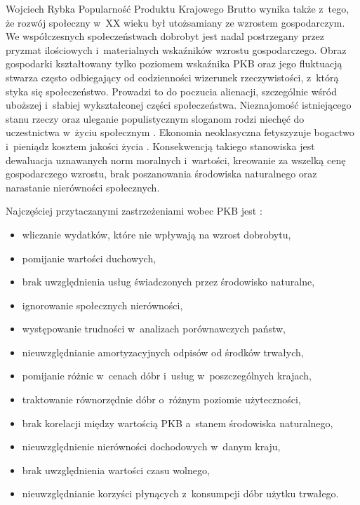 \begin{artplenv}{Wojciech Rybka}
Popularność Produktu Krajowego Brutto wynika także z~tego, że rozwój społeczny w~XX wieku był utożsamiany ze wzrostem
gospodarczym. We współczesnych społeczeństwach dobrobyt jest nadal postrzegany przez pryzmat ilościowych i~materialnych
wskaźników wzrostu gospodarczego. Obraz gospodarki kształtowany tylko poziomem wskaźnika PKB oraz jego fluktuacją
stwarza często odbiegający od codzienności wizerunek rzeczywistości, z~którą styka się społeczeństwo. Prowadzi to do
poczucia alienacji, szczególnie wśród uboższej i~słabiej wykształconej części społeczeństwa. Nieznajomość istniejącego
stanu rzeczy oraz uleganie populistycznym sloganom rodzi niechęć do uczestnictwa w~życiu społecznym
\parencite{dickinson_gdp:_2011}.
Ekonomia neoklasyczna fetyszyzuje bogactwo i~pieniądz kosztem jakości życia
\parencite{samuelson_ekonomia._2008}.
Konsekwencją takiego stanowiska jest dewaluacja uznawanych norm
moralnych i~wartości, kreowanie za wszelką cenę gospodarczego wzrostu, brak poszanowania środowiska naturalnego oraz
narastanie nierówności społecznych. 

Najczęściej przytaczanymi zastrzeżeniami wobec PKB jest
\parencite{stiglitz_blad_2013}:

\begin{itemize}
\item wliczanie wydatków, które nie wpływają na wzrost dobrobytu,
\item pomijanie wartości duchowych,
\item brak uwzględnienia usług świadczonych przez środowisko naturalne,
\item ignorowanie społecznych nierówności,
\item występowanie trudności w~analizach porównawczych państw, 
\item nieuwzględnianie amortyzacyjnych odpisów od środków trwałych, 
\item pomijanie różnic w~cenach dóbr i~usług w~poszczególnych krajach,
\item traktowanie równorzędnie dóbr o~różnym poziomie użyteczności,
\item brak korelacji między wartością PKB a~stanem środowiska naturalnego,
\item nieuwzględnienie nierówności dochodowych w~danym kraju,
\item brak uwzględnienia wartości czasu wolnego,
\item nieuwzględnianie korzyści płynących z~konsumpcji dóbr użytku trwałego.
\end{itemize}


\end{artplenv}
